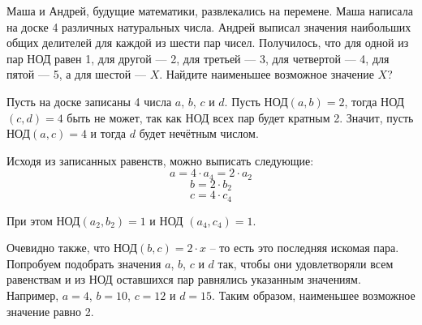
Маша и Андрей, будущие математики, развлекались на перемене. 
Маша написала на доске 4  различных натуральных числа. 
Андрей выписал значения наибольших общих делителей для каждой из шести пар чисел. 
Получилось, что для одной из пар НОД  равен 1, для другой — 2, для третьей — 3, для четвертой — 4, 
для пятой — 5, а для шестой — $X$. Найдите наименьшее возможное значение $X$?

\solutionSection

Пусть на доске записаны 4 числа $a$, $b$, $c$ и $d$. Пусть НОД$(a, b) = 2$, тогда \linebreak НОД$(c, d) = 4$ быть не 
может, так как НОД всех пар будет кратным 2. Значит, пусть НОД$(a, c) = 4$ и тогда $d$ будет нечётным числом.

Исходя из записанных равенств, можно выписать следующие:
$$a = 4\cdot a_4 = 2 \cdot a_2$$
$$b = 2\cdot b_2$$
$$c = 4\cdot c_4$$

При этом НОД$(a_2, b_2) = 1$ и НОД $(a_4, c_4) = 1$. 

Очевидно также, что  НОД$(b, c) = 2 \cdot x$ -- то есть это последняя искомая пара. Попробуем подобрать значения $a$, $b$, $c$ и $d$ так, чтобы они удовлетворяли всем равенствам и из НОД оставшихся пар равнялись указанным значениям. Например, $a = 4$, $b = 10$, $c = 12$ и $d = 15$. Таким образом, наименьшее возможное значение равно 2.


